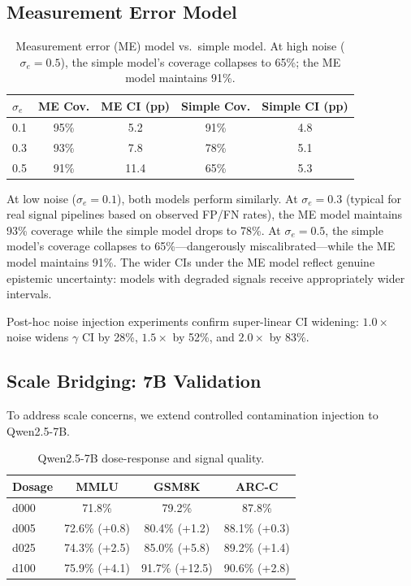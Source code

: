 \documentclass[11pt,a4paper]{article}
\begin{document}
\subsection{Measurement Error Model}
\label{sec:me_model}

\begin{table}[t]
\centering
\small
\caption{Measurement error (ME) model vs.\ simple model. At high noise ($\sigma_e = 0.5$), the simple model's coverage collapses to 65\%; the ME model maintains 91\%.}
\label{tab:me}
\begin{tabular}{lcccc}
\toprule
$\sigma_e$ & \textbf{ME Cov.} & \textbf{ME CI (pp)} & \textbf{Simple Cov.} & \textbf{Simple CI (pp)} \\
\midrule
0.1 & 95\% & 5.2 & 91\% & 4.8 \\
0.3 & 93\% & 7.8 & 78\% & 5.1 \\
0.5 & 91\% & 11.4 & 65\% & 5.3 \\
\bottomrule
\end{tabular}
\end{table}

At low noise ($\sigma_e = 0.1$), both models perform similarly.
At $\sigma_e = 0.3$ (typical for real signal pipelines based on observed FP/FN rates), the ME model maintains 93\% coverage while the simple model drops to 78\%.
At $\sigma_e = 0.5$, the simple model's coverage collapses to 65\%---dangerously miscalibrated---while the ME model maintains 91\%.
The wider CIs under the ME model reflect genuine epistemic uncertainty: models with degraded signals receive appropriately wider intervals.

Post-hoc noise injection experiments confirm super-linear CI widening: $1.0\times$ noise widens $\gamma$ CI by 28\%, $1.5\times$ by 52\%, and $2.0\times$ by 83\%.

\subsection{Scale Bridging: 7B Validation}
\label{sec:7b}

To address scale concerns, we extend controlled contamination injection to Qwen2.5-7B.

\begin{table}[t]
\centering
\small
\caption{Qwen2.5-7B dose-response and signal quality.}
\label{tab:7b_dose}
\begin{tabular}{lccc}
\toprule
\textbf{Dosage} & \textbf{MMLU} & \textbf{GSM8K} & \textbf{ARC-C} \\
\midrule
d000 & 71.8\% & 79.2\% & 87.8\% \\
d005 & 72.6\% (+0.8) & 80.4\% (+1.2) & 88.1\% (+0.3) \\
d025 & 74.3\% (+2.5) & 85.0\% (+5.8) & 89.2\% (+1.4) \\
d100 & 75.9\% (+4.1) & 91.7\% (+12.5) & 90.6\% (+2.8) \\
\bottomrule
\end{tabular}
\end{table}
\end{document}
